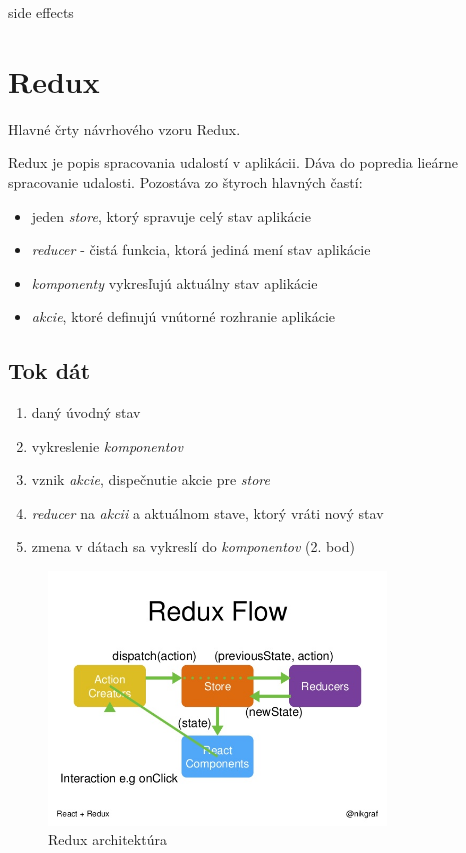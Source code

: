 \TODO{} side effects












\section{Redux}
Hlavné črty návrhového vzoru Redux. 

Redux je popis spracovania udalostí v aplikácii. Dáva do popredia lieárne spracovanie udalosti. Pozostáva zo štyroch hlavných častí:
\begin{itemize}
\item jeden \emph{store}, ktorý spravuje celý stav aplikácie
\item \emph{reducer} - čistá funkcia, ktorá jediná mení stav aplikácie
\item \emph{komponenty} vykresľujú aktuálny stav aplikácie
\item \emph{akcie}, ktoré definujú vnútorné rozhranie aplikácie
\end{itemize}

\subsection{Tok dát}
\begin{enumerate}
\item daný úvodný stav
\item vykreslenie \emph{komponentov}
\item vznik \emph{akcie}, dispečnutie akcie pre \emph{store}
\item \emph{reducer} na \emph{akcii} a aktuálnom stave, ktorý vráti nový stav
\item zmena v dátach sa vykreslí do \emph{komponentov} (2. bod)
\end{enumerate}


\begin{figure}
  \centering
    \includegraphics[width=0.8\textwidth]{./images/redux.jpg}
  \caption{Redux architektúra}
\end{figure}

